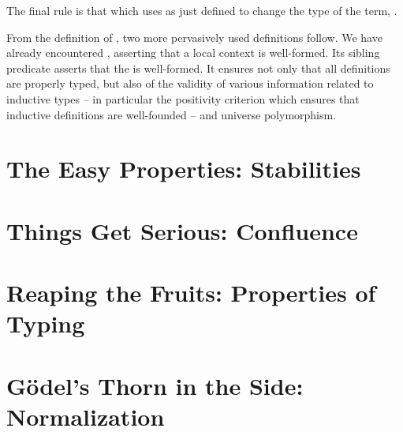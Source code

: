 The final rule is that which uses  as just defined
to change the type of the term, \eg {}.

From the definition of , two more pervasively used definitions
follow. We have already encountered ,
asserting that a local context is well-formed.
Its sibling predicate %
asserts that the  is well-formed. It ensures not only that all definitions
are properly typed, but also of the validity of various information
related to inductive types – in particular the positivity criterion which ensures that inductive
definitions are well-founded – and universe polymorphism.

\section[Stabilities]{The Easy Properties: Stabilities}
\label{sec:pcuic-stabilities}

\section[Confluence]{Things Get Serious: Confluence}
\label{sec:pcuic-confluence}


\section[Properties of Typing]{Reaping the Fruits: Properties of Typing}
\label{sec:meta-typing-prop}

\section[Normalization]{Gödel’s Thorn in the Side: Normalization}
\label{sec:meta-normalization}